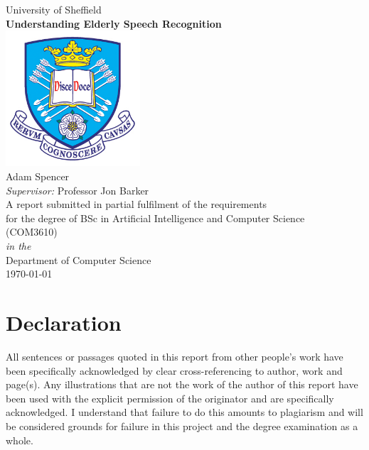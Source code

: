 \documentclass[11pt,oneside]{book}
\begin{document}
\frontmatter

\begin{titlepage}


\begin{center}
{\LARGE University of Sheffield}\\[1.5cm]
\linespread{1.2}\huge {\bfseries Understanding Elderly Speech Recognition}\\[1.5cm]
\linespread{1}
\includegraphics[width=5cm]{images/tuoslogo}\\[1cm]
{\Large Adam Spencer}\\[1cm]
{\large \emph{Supervisor:} Professor Jon Barker}\\[1cm]
\large A report submitted in partial fulfilment of the requirements\\ for the degree of BSc in Artificial Intelligence and Computer Science\\ (COM3610)\\[0.3cm] 
\textit{in the}\\[0.3cm]
Department of Computer Science\\[2cm]
\today
\end{center}

\end{titlepage}


\newpage
\chapter*{\Large Declaration}


All sentences or passages quoted in this report from other people's work have been specifically
acknowledged by clear cross-referencing to author, work and page(s).
Any illustrations that are not the work of the author of this report have been used with the
explicit permission of the originator and are specifically acknowledged.
I understand that failure to do this amounts to plagiarism and will be considered grounds for
failure in this project and the degree examination as a whole.\\[1cm]
\end{document}
